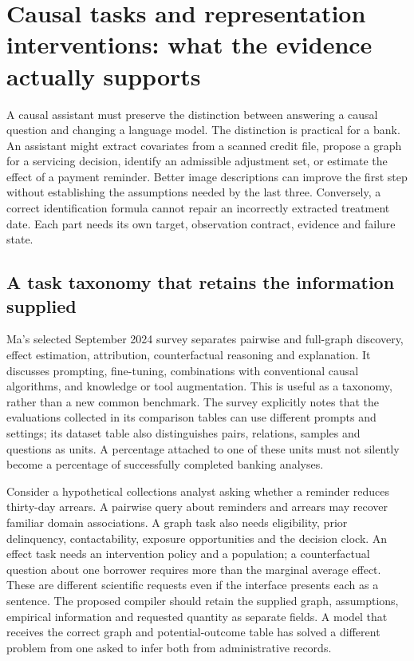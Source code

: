 \section[Causal tasks and representation interventions]{Causal tasks and representation interventions: what the evidence actually supports}
\label{sec:exec28-fr}
A causal assistant must preserve the distinction between answering a causal question and changing a language model.
The distinction is practical for a bank. An assistant might extract covariates from a scanned credit file,
propose a graph for a servicing decision, identify an admissible adjustment set, or estimate the effect of a payment reminder.
Better image descriptions can improve the first step without establishing the assumptions needed by the last three.
Conversely, a correct identification formula cannot repair an incorrectly extracted treatment date. Each part needs its own
target, observation contract, evidence and failure state.

\subsection{A task taxonomy that retains the information supplied}
Ma's selected September 2024 survey separates pairwise and full-graph discovery, effect estimation,
attribution, counterfactual reasoning and explanation. It discusses prompting, fine-tuning, combinations with conventional
causal algorithms, and knowledge or tool augmentation. This is useful as a taxonomy, rather than a new common benchmark.
The survey explicitly notes that the evaluations collected in its comparison tables can use different prompts and settings;
its dataset table also distinguishes pairs, relations, samples and questions as units. A percentage attached to one of these
units must not silently become a percentage of successfully completed banking analyses.~\citep{exec28_fr_ma}

Consider a hypothetical collections analyst asking whether a reminder reduces thirty-day arrears. A pairwise query about
reminders and arrears may recover familiar domain associations. A graph task also needs eligibility, prior delinquency,
contactability, exposure opportunities and the decision clock. An effect task needs an intervention policy and a population;
a counterfactual question about one borrower requires more than the marginal average effect. These are different scientific
requests even if the interface presents each as a sentence. The proposed compiler should retain the supplied graph,
assumptions, empirical information and requested quantity as separate fields. A model that receives the correct graph and
potential-outcome table has solved a different problem from one asked to infer both from administrative records.

